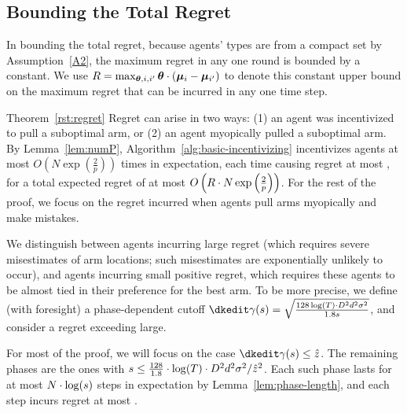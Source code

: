 \subsection{Bounding the Total Regret}
In bounding the total regret, because agents' types are from a compact
set by Assumption~\ref{A2}, the maximum regret in any one round is
bounded by a constant.
We use $R = \max_{\bm{\theta}, i,i'} \bm{\theta} \cdot (\bm{\mu}_{i} - \bm{\mu}_{i'})$
to denote this constant upper bound on the maximum regret that can be
incurred in any one time step. 


\begin{emptyextraproof}{Theorem~\ref{rst:regret}}
Regret can arise in two ways:
(1) an agent was incentivized to pull a suboptimal arm, or
(2) an agent myopically pulled a suboptimal arm.
By Lemma~\ref{lem:numP}, Algorithm~\ref{alg:basic-incentivizing}
incentivizes agents at most 
$O\left( N\exp\left(\frac{2}{p}\right) \right)$
times in expectation, each time causing regret at most \MAXR,
for a total expected regret of at most
$O\left(R\cdot N\exp\left(\frac{2}{p}\right) \right)$.
For the rest of the proof, we focus on the regret incurred when agents
pull arms myopically and make mistakes.

We distinguish between agents incurring large regret
(which requires severe misestimates of arm locations;
such misestimates are exponentially unlikely to occur), 
and agents incurring small positive regret,
which requires these agents to be almost tied in their preference for
the best arm.
To be more precise, we define (with foresight) a phase-dependent
cutoff
$\EarlyCut{s} = \sqrt{\frac{128\log(T) \cdot \Diam^2 d^2 \sigma^2}{1.8 s}}$,
and consider a regret exceeding  large.

For most of the proof, we will focus on the case $\EarlyCut{s} \leq \TieCutoff$.
The remaining phases are the ones with
$s \leq \frac{128}{1.8} \cdot \log(T) \cdot D^2 d^2 \sigma^2/\hat{z}^2$.
Each such phase lasts for at most $N \cdot \log(s)$ steps
in expectation by Lemma~\ref{lem:phase-length},
and each step incurs regret at most \MAXR.


\end{emptyextraproof}
